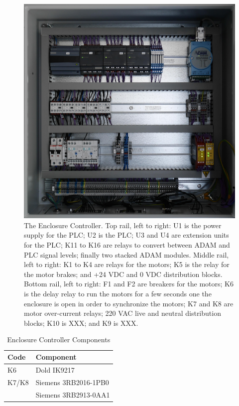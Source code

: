 \begin{figure}
\begin{center}
\includegraphics[width=\linewidth]{figures/enclosure-controller-inside.jpg}
\end{center}
\caption{The Enclosure Controller. Top rail, left to right: U1 is the power supply for the PLC; U2 is the PLC; U3 and U4 are extension units for the PLC; K11 to K16 are relays to convert between ADAM and PLC signal levels; finally two stacked ADAM modules. Middle rail, left to right: K1 to K4 are relays for the motors; K5 is the relay for the motor brakes; and +24 VDC and 0 VDC distribution blocks. Bottom rail, left to right: F1 and F2 are breakers for the motors; K6 is the delay relay to run the motors for a few seconds one the enclosure is open in order to synchronize the motors; K7 and K8 are motor over-current relays; 220 VAC live and neutral distribution blocks; K10 is XXX; and K9 is XXX.}
\label{figure:enclosure-controller-inside}
\end{figure}

\begin{table}
\caption{Enclosure Controller Components}
\begin{center}
\begin{tabular}{ll}
\hline
Code&Component\\
\hline
K6&Dold IK9217\\
K7/K8&Siemens 3RB2016-1PB0\\
     &Siemens 3RB2913-0AA1\\
\hline
\end{tabular}
\end{center}
\end{table}

